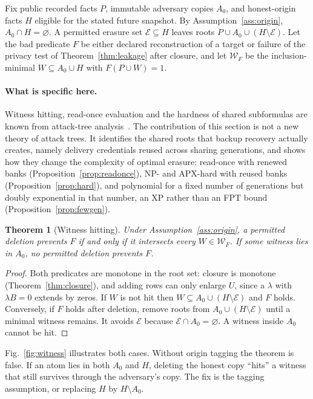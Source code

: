 \documentclass[pdflatex,sn-mathphys-num]{sn-jnl}%
\theoremstyle{plain}
\newtheorem{theorem}{Theorem}
\theoremstyle{definition}
\begin{document}
Fix public recorded facts $P$, immutable adversary copies $A_0$, and honest-origin facts $H$ eligible for the stated future snapshot. By Assumption~\ref{ass:origin}, $A_0\cap H=\varnothing$. A permitted erasure set $\mathcal E\subseteq H$ leaves roots $P\cup A_0\cup(H\setminus\mathcal E)$. Let the bad predicate $F$ be either declared reconstruction of a target or failure of the privacy test of Theorem~\ref{thm:leakage} after closure, and let $\mathcal W_F$ be the inclusion-minimal $W\subseteq A_0\cup H$ with $F(P\cup W)=1$.

\paragraph{What is specific here.}
Witness hitting, read-once evaluation and the hardness of shared subformulas are known from attack-tree analysis~\cite{mauw2005,lopuhaa2022}. The contribution of this section is not a new theory of attack trees. It identifies the shared roots that backup recovery actually creates, namely delivery credentials reused across sharing generations, and shows how they change the complexity of optimal erasure: read-once with renewed banks (Proposition~\ref{prop:readonce}), NP- and APX-hard with reused banks (Proposition~\ref{prop:hard}), and polynomial for a fixed number of generations but doubly exponential in that number, an XP rather than an FPT bound (Proposition~\ref{prop:fewgen}).

\begin{theorem}[Witness hitting]\label{thm:cuts}
Under Assumption~\ref{ass:origin}, a permitted deletion prevents $F$ if and only if it intersects every $W\in\mathcal W_F$. If some witness lies in $A_0$, no permitted deletion prevents $F$.
\end{theorem}
\begin{proof}
Both predicates are monotone in the root set: closure is monotone (Theorem~\ref{thm:closure}), and adding rows can only enlarge $U$, since a $\lambda$ with $\lambda B=0$ extends by zeros. If $W$ is not hit then $W\subseteq A_0\cup(H\setminus\mathcal E)$ and $F$ holds. Conversely, if $F$ holds after deletion, remove roots from $A_0\cup(H\setminus\mathcal E)$ until a minimal witness remains. It avoids $\mathcal E$ because $\mathcal E\cap A_0=\varnothing$. A witness inside $A_0$ cannot be hit.
\end{proof}

Fig.~\ref{fig:witness} illustrates both cases. Without origin tagging the theorem is false. If an atom lies in both $A_0$ and $H$, deleting the honest copy ``hits'' a witness that still survives through the adversary's copy. The fix is the tagging assumption, or replacing $H$ by $H\setminus A_0$.
\end{document}
